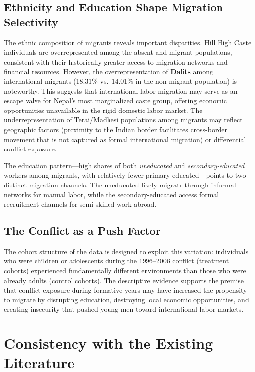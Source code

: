 \documentclass[12pt,letterpaper]{article}
\begin{document}
\subsection{Ethnicity and Education Shape Migration Selectivity}

The ethnic composition of migrants reveals important disparities. Hill High Caste individuals are overrepresented among the absent and migrant populations, consistent with their historically greater access to migration networks and financial resources. However, the overrepresentation of \textbf{Dalits} among international migrants (18.31\% vs.\ 14.01\% in the non-migrant population) is noteworthy. This suggests that international labor migration may serve as an escape valve for Nepal's most marginalized caste group, offering economic opportunities unavailable in the rigid domestic labor market. The underrepresentation of Terai/Madhesi populations among migrants may reflect geographic factors (proximity to the Indian border facilitates cross-border movement that is not captured as formal international migration) or differential conflict exposure.

The education pattern---high shares of both \textit{uneducated} and \textit{secondary-educated} workers among migrants, with relatively fewer primary-educated---points to two distinct migration channels. The uneducated likely migrate through informal networks for manual labor, while the secondary-educated access formal recruitment channels for semi-skilled work abroad.

\subsection{The Conflict as a Push Factor}

The cohort structure of the data is designed to exploit this variation: individuals who were children or adolescents during the 1996--2006 conflict (treatment cohorts) experienced fundamentally different environments than those who were already adults (control cohorts). The descriptive evidence supports the premise that conflict exposure during formative years may have increased the propensity to migrate by disrupting education, destroying local economic opportunities, and creating insecurity that pushed young men toward international labor markets.


\section{Consistency with the Existing Literature}
\end{document}
